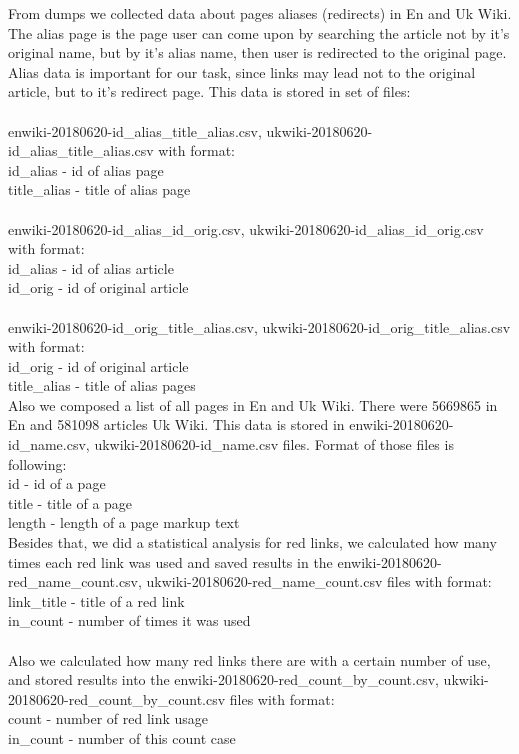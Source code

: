 \documentclass[11pt,a4paper]{article}
\begin{document}
From dumps we collected data about pages aliases (redirects) in En and Uk Wiki. The alias page is the page user can come upon by searching the article not by it's original name, but by it's alias name, then user is redirected to the original page. Alias data is important for our task, since links may lead not to the original article, but to it's redirect page. This data is stored in set of files:\\
\\
enwiki-20180620-id\_alias\_title\_alias.csv, ukwiki-20180620-id\_alias\_title\_alias.csv with format:\\
id\_alias - id of alias page\\
title\_alias - title of alias page\\
\\
enwiki-20180620-id\_alias\_id\_orig.csv, ukwiki-20180620-id\_alias\_id\_orig.csv with format:\\
id\_alias - id of alias article\\
id\_orig - id of original article\\
\\
enwiki-20180620-id\_orig\_title\_alias.csv, ukwiki-20180620-id\_orig\_title\_alias.csv with format:\\
id\_orig - id of original article\\
title\_alias - title of alias pages\\

Also we composed a list of all pages in En and Uk Wiki. There were 5669865 in En and 581098 articles Uk Wiki. This data is stored in enwiki-20180620-id\_name.csv, ukwiki-20180620-id\_name.csv files. Format of those files is following:\\ 
id - id of a page\\
title - title of a page\\
length - length of a page markup text\\

Besides that, we did a statistical analysis for red links, we calculated how many times each red link was used and saved results in the enwiki-20180620-red\_name\_count.csv, ukwiki-20180620-red\_name\_count.csv files with format:\\
link\_title - title of a red link\\
in\_count - number of times it was used\\
\\
Also we calculated how many red links there are with a certain number of use, and stored results into the enwiki-20180620-red\_count\_by\_count.csv, ukwiki-20180620-red\_count\_by\_count.csv files with format:\\
count - number of red link usage\\
in\_count - number of this count case\\
\end{document}
